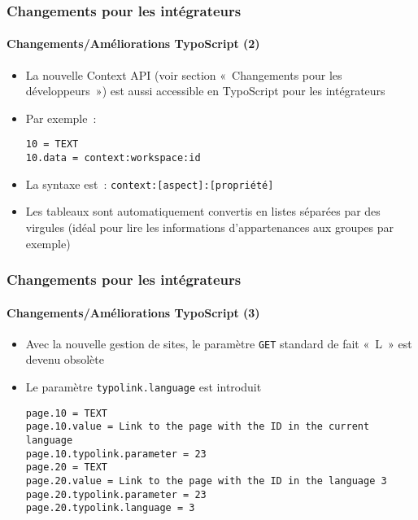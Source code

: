 \begin{frame}[fragile]
	\frametitle{Changements pour les intégrateurs}
	\framesubtitle{Changements/Améliorations TypoScript (2)}

	\lstset{basicstyle=\smaller\ttfamily}

	\begin{itemize}
		\item La nouvelle Context API (voir section «~Changements pour les développeurs~»)
			est aussi accessible en TypoScript pour les intégrateurs

		\item Par exemple~:

			\begin{lstlisting}
10 = TEXT
10.data = context:workspace:id
			\end{lstlisting}

		\item La syntaxe est~: \texttt{context:[aspect]:[propriété]}

		\item Les tableaux sont automatiquement convertis en listes séparées par des virgules\newline
			\smaller(idéal pour lire les informations d'appartenances aux groupes par exemple)\normalsize

	\end{itemize}

\end{frame}


\begin{frame}[fragile]
	\frametitle{Changements pour les intégrateurs}
	\framesubtitle{Changements/Améliorations TypoScript (3)}

	\lstset{basicstyle=\smaller\ttfamily}

	\begin{itemize}
		\item Avec la nouvelle gestion de sites, le paramètre \texttt{GET}
			standard de fait «~L~» est devenu obsolète
		\item Le paramètre \texttt{typolink.language} est introduit

			\begin{lstlisting}
page.10 = TEXT
page.10.value = Link to the page with the ID in the current language
page.10.typolink.parameter = 23
page.20 = TEXT
page.20.value = Link to the page with the ID in the language 3
page.20.typolink.parameter = 23
page.20.typolink.language = 3
			\end{lstlisting}

	\end{itemize}

\end{frame}

